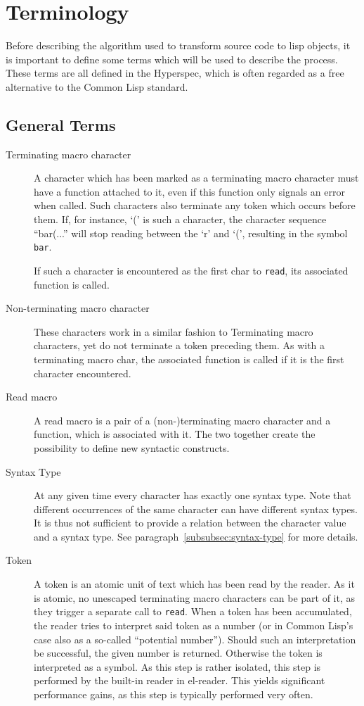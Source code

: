 \documentclass[a4paper,10pt,twoside]{report}
\newcommand{\cl}{Common Lisp}
\newcommand{\elr}{el-reader}
\newcommand{\sym}[1]{\texttt{#1}}
\newcommand{\fun}[1]{\texttt{#1}}
\newcommand{\Read}{\fun{read}}
\begin{document}
\section{Terminology}
\label{subsec:terminology}

Before describing the algorithm used to transform source code to lisp objects,
it is important to define some terms which will be used to describe the
process.  These terms are all defined in the Hyperspec, which is often regarded
as a free alternative to the \cl{} standard.

\subsection{General Terms}
\label{subsubsec:general-terms}

\begin{description}
\item[Terminating macro character] A character which has been marked as a
  terminating macro character must have a function attached to it, even if this
  function only signals an error when called.  Such characters also terminate
  any token which occurs before them.  If, for instance, `(' is such a
  character, the character sequence ``bar(...'' will stop reading between the
  `r' and `(', resulting in the symbol \sym{bar}.

  If such a character is encountered as the first char to \Read{}, its
  associated function is called.
\item[Non-terminating macro character] These characters work in a similar
  fashion to Terminating macro characters, yet do not terminate a token
  preceding them.  As with a terminating macro char, the associated function is
  called if it is the first character encountered.
\item [Read macro] A read macro is a pair of a (non-)terminating macro character
  and a function, which is associated with it.  The two together create the
  possibility to define new syntactic constructs.
\item[Syntax Type] At any given time every character has exactly one syntax
  type.  Note that different occurrences of the same character can have
  different syntax types.  It is thus not sufficient to provide a relation
  between the character value and a syntax type.  See
  paragraph~\ref{subsubsec:syntax-type} for more details.
\item[Token] A token is an atomic unit of text which has been read by the
  reader.  As it is atomic, no unescaped terminating macro characters can be
  part of it, as they trigger a separate call to \Read{}.  When a token has been
  accumulated, the reader tries to interpret said token as a number (or in
  \cl{}’s case also as a so-called ``potential number'').  Should such an
  interpretation be successful, the given number is returned.  Otherwise the
  token is interpreted as a symbol.  As this step is rather isolated, this step
  is performed by the built-in reader in \elr{}.  This yields significant
  performance gains, as this step is typically performed very often.
\end{description}
\end{document}
